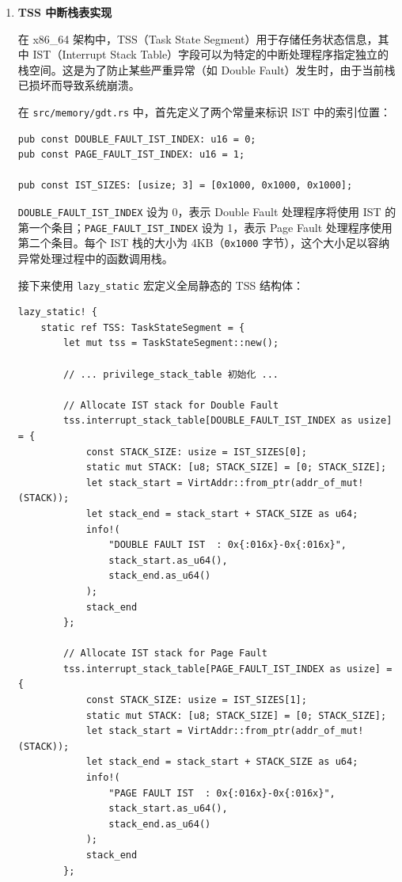 \documentclass{SYSUReport}
\begin{document}
\begin{enumerate}[label={\chinese*、},labelsep=0pt]

    \item \textbf{TSS 中断栈表实现}

    在 x86\_64 架构中，TSS（Task State Segment）用于存储任务状态信息，其中 IST（Interrupt Stack Table）字段可以为特定的中断处理程序指定独立的栈空间。这是为了防止某些严重异常（如 Double Fault）发生时，由于当前栈已损坏而导致系统崩溃。

    在 \texttt{src/memory/gdt.rs} 中，首先定义了两个常量来标识 IST 中的索引位置：

    \begin{verbatim}
pub const DOUBLE_FAULT_IST_INDEX: u16 = 0;
pub const PAGE_FAULT_IST_INDEX: u16 = 1;

pub const IST_SIZES: [usize; 3] = [0x1000, 0x1000, 0x1000];
    \end{verbatim}

    \texttt{DOUBLE\_FAULT\_IST\_INDEX} 设为 0，表示 Double Fault 处理程序将使用 IST 的第一个条目；\texttt{PAGE\_FAULT\_IST\_INDEX} 设为 1，表示 Page Fault 处理程序使用第二个条目。每个 IST 栈的大小为 4KB（\texttt{0x1000} 字节），这个大小足以容纳异常处理过程中的函数调用栈。

    接下来使用 \texttt{lazy\_static} 宏定义全局静态的 TSS 结构体：

    \begin{verbatim}
lazy_static! {
    static ref TSS: TaskStateSegment = {
        let mut tss = TaskStateSegment::new();

        // ... privilege_stack_table 初始化 ...

        // Allocate IST stack for Double Fault
        tss.interrupt_stack_table[DOUBLE_FAULT_IST_INDEX as usize] = {
            const STACK_SIZE: usize = IST_SIZES[0];
            static mut STACK: [u8; STACK_SIZE] = [0; STACK_SIZE];
            let stack_start = VirtAddr::from_ptr(addr_of_mut!(STACK));
            let stack_end = stack_start + STACK_SIZE as u64;
            info!(
                "DOUBLE FAULT IST  : 0x{:016x}-0x{:016x}",
                stack_start.as_u64(),
                stack_end.as_u64()
            );
            stack_end
        };
        
        // Allocate IST stack for Page Fault
        tss.interrupt_stack_table[PAGE_FAULT_IST_INDEX as usize] = {
            const STACK_SIZE: usize = IST_SIZES[1];
            static mut STACK: [u8; STACK_SIZE] = [0; STACK_SIZE];
            let stack_start = VirtAddr::from_ptr(addr_of_mut!(STACK));
            let stack_end = stack_start + STACK_SIZE as u64;
            info!(
                "PAGE FAULT IST  : 0x{:016x}-0x{:016x}",
                stack_start.as_u64(),
                stack_end.as_u64()
            );
            stack_end
        };


\end{verbatim}
\end{enumerate}
\end{document}
